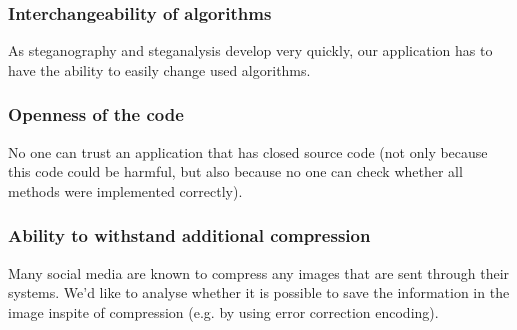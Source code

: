 \subsubsection{Interchangeability of algorithms}
As steganography and steganalysis develop very quickly, our application
has to have the ability to easily change used algorithms.  

\subsubsection{Openness of the code}
No one can trust an application that has closed source code (not only because
this code could be harmful, but also because no one can check whether all
methods were implemented correctly).

\subsubsection{Ability to withstand additional compression}
Many social media are known to compress any images that are sent through
their systems. We'd like to analyse whether it is possible to save the information
in the image inspite of compression (e.g. by using error correction encoding).

